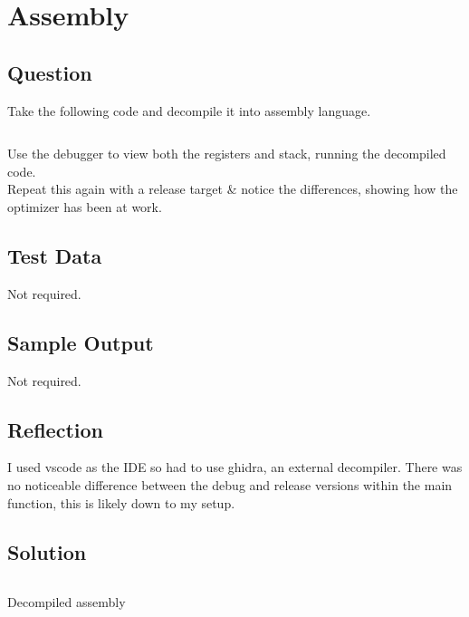 \documentclass[Lab-B.tex]{subfiles}
\begin{document}
    \section{Assembly}
        \subsection{Question}
            Take the following code and decompile it into assembly language.

            \inputminted{cpp}{../Tasks/03-Assembly/Assembly.cpp}

            Use the debugger to view both the registers and stack, 
            running the decompiled code.\\

            Repeat this again with a release target \& notice the differences,
            showing how the optimizer has been at work.

        \subsection{Test Data}
            Not required.
        
        \subsection{Sample Output}
            Not required.
        \subsection{Reflection}
            I used vscode as the IDE so had to use ghidra, an external decompiler.
            There was no noticeable difference between the debug and release versions within the main function, 
            this is likely down to my setup.

        \subsection{Solution}
            \begin{listing}[H]            
                {\renewcommand\fcolorbox[4][]{\textcolor{cyan}{\strut#4}}
                    \inputminted[fontsize=\tiny]{gas}{../Tasks/03-Assembly/Assembly.txt}
                    \caption{Decompiled assembly}
                }
            \end{listing}
\end{document}
